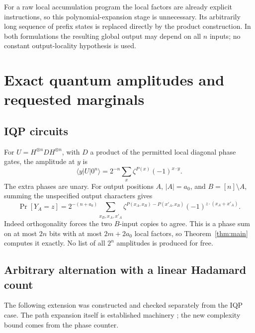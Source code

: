 \documentclass[11pt,a4paper]{article}
\theoremstyle{remark}\newtheorem{remark}[theorem]{Remark}
\begin{document}
For a raw local accumulation program the local factors are already explicit
instructions, so this polynomial-expansion stage is unnecessary. Its
arbitrarily long sequence of prefix states is replaced directly by the
product construction. In both formulations the resulting global output
may depend on all $n$ inputs; no constant output-locality hypothesis is used.

\section{Exact quantum amplitudes and requested marginals}
\subsection{IQP circuits}
For $U=H^{\otimes n}DH^{\otimes n}$, with $D$ a product of the permitted
local diagonal phase gates, the amplitude at $y$ is
\[
 \langle y|U|0^n\rangle=2^{-n}\sum_x\zeta^{P(x)}(-1)^{x\cdot y}.
\]
The extra phases are unary. For output positions $A$, $|A|=a_0$, and
$B=[n]\setminus A$, summing the unspecified output characters gives
\begin{equation}\label{eq:prefix}
 \Pr[Y_A=z]=2^{-(n+a_0)}
 \sum_{x_B,x_A,x'_A}
 \zeta^{P(x_A,x_B)-P(x'_A,x_B)}
 (-1)^{z\cdot(x_A+x'_A)}.
\end{equation}
Indeed orthogonality forces the two $B$-input copies to agree. This is
a phase sum on at most $2n$ bits with at most $2m+2a_0$ local factors,
so Theorem~\ref{thm:main} computes it exactly. No list of all $2^n$
amplitudes is produced for free.

\subsection{Arbitrary alternation with a linear Hadamard count}
The following extension was constructed and checked separately from
the IQP case. The path expansion itself is established machinery
\cite{decolnet}; the new complexity bound comes from the phase counter.
\end{document}

